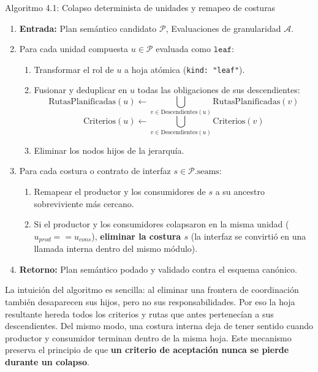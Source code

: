 \begin{algorithmbox}{Algoritmo 4.1: Colapso determinista de unidades y remapeo de costuras}
\label{alg:apply-granularity}
\small
\begin{enumerate}
  \item \textbf{Entrada:} Plan semántico candidato $\mathcal{P}$, Evaluaciones de granularidad $\mathcal{A}$.
  \item Para cada unidad compuesta $u \in \mathcal{P}$ evaluada como $\texttt{leaf}$:
    \begin{enumerate}
      \item Transformar el rol de $u$ a hoja atómica (\texttt{kind: "leaf"}).
      \item Fusionar y deduplicar en $u$ todas las obligaciones de sus descendientes:
        $$\text{RutasPlanificadas}(u) \leftarrow \bigcup_{v \in \text{Descendientes}(u)} \text{RutasPlanificadas}(v)$$
        $$\text{Criterios}(u) \leftarrow \bigcup_{v \in \text{Descendientes}(u)} \text{Criterios}(v)$$
      \item Eliminar los nodos hijos de la jerarquía.
    \end{enumerate}
  \item Para cada costura o contrato de interfaz $s \in \mathcal{P}.\text{seams}$:
    \begin{enumerate}
      \item Remapear el productor y los consumidores de $s$ a su ancestro sobreviviente más cercano.
      \item Si el productor y los consumidores colapsaron en la misma unidad ($u_{prod} == u_{cons}$), \textbf{eliminar la costura $s$} (la interfaz se convirtió en una llamada interna dentro del mismo módulo).
    \end{enumerate}
  \item \textbf{Retorno:} Plan semántico podado y validado contra el esquema canónico.
\end{enumerate}
\end{algorithmbox}

La intuición del algoritmo es sencilla: al eliminar una frontera de coordinación también desaparecen sus hijos, pero no sus responsabilidades. Por eso la hoja resultante hereda todos los criterios y rutas que antes pertenecían a sus descendientes. Del mismo modo, una costura interna deja de tener sentido cuando productor y consumidor terminan dentro de la misma hoja. Este mecanismo preserva el principio de que \textbf{un criterio de aceptación nunca se pierde durante un colapso}.

